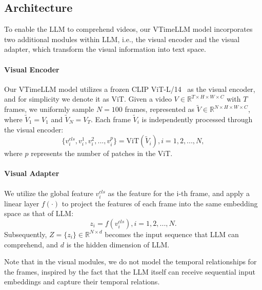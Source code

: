 \documentclass[10pt,twocolumn,letterpaper]{article}
\begin{document}
\subsection{Architecture}

To enable the LLM to comprehend videos, our VTimeLLM model incorporates two additional modules within LLM, i.e., the visual encoder and the visual adapter, which transform the visual information into text space.

\paragraph{Visual Encoder} Our VTimeLLM model utilizes a frozen CLIP ViT-L/14~\cite{clip} as the visual encoder, and for simplicity we denote it as ViT. Given a video $V\in \mathbb{R}^{T \times H \times W \times C}$ with $T$ frames, we uniformly sample $N=100$ frames, represented as $\tilde{V} \in \mathbb{R}^{N \times H \times W \times C}$, where $\tilde{V}_1 = V_1 $ and  $\tilde{V}_N = V_T$. Each frame $\tilde{V}_i$ is independently processed through the visual encoder:
\begin{equation}
    \{v_i^{cls}, v_i^{1}, v_i^{2}, ..., v_i^{p}\} = \text{ViT}(\tilde{V}_i), i=1,2,...,N,
\end{equation}
where $p$ represents the number of patches in the ViT. 

\paragraph{Visual Adapter}  We utilize the global feature $v_i^{cls}$ as the feature for the i-th frame, and apply a linear layer $f(\cdot)$ to project the features of each frame into the same embedding space as that of LLM:
\begin{equation}
    z_i = f(v_i^{cls}), i=1,2,...,N.
\end{equation}
Subsequently, $Z = \{z_i\} \in \mathbb{R}^{N \times d}$ becomes the input sequence that LLM can comprehend, and $d$ is the hidden dimension of LLM.

Note that in the visual modules, we do not model the temporal relationships for the frames, inspired by the fact that the LLM itself can receive sequential input embeddings and capture their temporal relations.  
\end{document}
